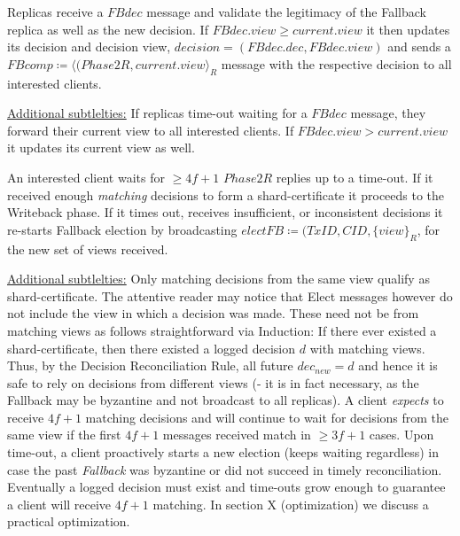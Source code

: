 Replicas receive a $FBdec$ message and validate the legitimacy of the Fallback replica as well as the new decision. If $FBdec.view \geq current.view$ it then updates its decision and decision view, $decision = (FBdec.dec, FBdec.view)$ and sends a $FBcomp \coloneqq \langle(Phase2R, current.view\rangle_R$ message with the respective decision to all interested clients.

\underline{Additional subtlelties:} If replicas time-out waiting for a $FBdec$ message, they forward their current view to all interested clients. If $FBdec.view > current.view$ it updates its current view as well.

An interested client waits for $\geq 4f+1$ $Phase2R$ replies up to a time-out. If it received enough \textit{matching} decisions to form a shard-certificate it proceeds to the Writeback phase. If it times out, receives insufficient, or inconsistent decisions it re-starts Fallback election by broadcasting $electFB \coloneqq (TxID, CID, \{view\}_R$, for the new set of views received.

\underline{Additional subtlelties:} Only matching decisions from the same view qualify as shard-certificate. The attentive reader may notice that Elect messages however do not include the view in which a decision was made. These need not be from matching views as follows straightforward via Induction: If there ever existed a shard-certificate, then there existed a logged decision $d$ with matching views. Thus, by the Decision Reconciliation Rule, all future $dec_{new} = d$ and hence it is safe to rely on decisions from different views (- it is in fact necessary, as the Fallback may be byzantine and not broadcast to all replicas).
A client \textit{expects} to receive $4f+1$ matching decisions and will continue to wait for decisions from the same view if the first $4f+1$ messages received match in $\geq 3f+1$ cases. Upon time-out, a client proactively starts a new election (keeps waiting regardless) in case the past \textit{Fallback} was byzantine or did not succeed in timely reconciliation. Eventually a logged decision must exist and time-outs grow enough to guarantee a client will receive $4f+1$ matching. In section X (optimization) we discuss a practical optimization.
 \\


